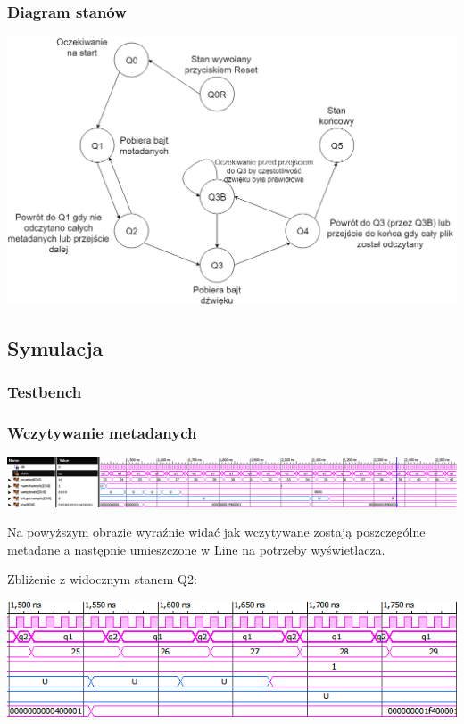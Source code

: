 \documentclass{article}
\begin{document}
\newpage 
\subsubsection{Diagram stanów}
\begin{center}
	\includegraphics[scale=0.5, center]{photo/states.png}
\end{center}

\newpage
\subsection{Symulacja}
\subsubsection{Testbench}

\subsubsection{Wczytywanie metadanych}
\begin{center}
	\includegraphics[scale=0.52, center]{photo/d_meta_1.png}
\end{center}
\par Na powyższym obrazie wyraźnie widać jak wczytywane zostają poszczególne metadane a następnie umieszczone w Line na potrzeby wyświetlacza. 
\par Zbliżenie z widocznym stanem Q2:
\begin{center}
	\includegraphics[scale=1.0, center]{photo/d_meta_2.png}
\end{center}
\end{document}
